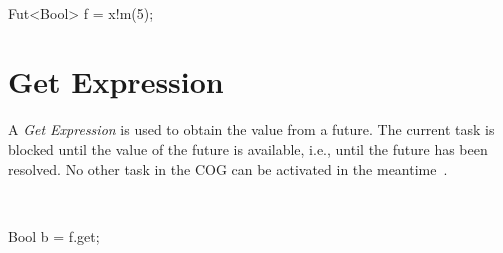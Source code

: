 \begin{abssyntax}
  {}\ \TRS{!}\ \ \TRS{(}  \TRS{)}  
\end{abssyntax}

\begin{absexample}
Fut<Bool> f = x!m(5);  
\end{absexample}

\section{Get Expression}\label{sec:getexpr}
A \emph{Get Expression} is used to obtain the value from a future.
The current task is blocked until the value of the future is available, i.e., until
the future has been resolved. No other task in the COG can be activated in
the meantime~\cite{johnsen10fmco}.

\begin{abssyntax}
  {}\ \ 
\end{abssyntax}

\begin{absexample}
Bool b = f.get;
\end{absexample}

